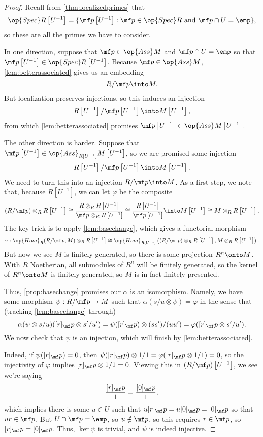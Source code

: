 \begin{proof}
	Recall from \autoref{thm:localizedprimes} that
	\[\op{Spec}R\left[U^{-1}\right]=\{\mf p\left[U^{-1}\right]:\mf p\in\op{Spec}R\text{ and }\mf p\cap U=\emp\},\]
	so these are all the primes we have to consider.
	
	In one direction, suppose that $\mf p\in\op{Ass}M$ and $\mf p\cap U=\emp$ so that $\mf p\left[U^{-1}\right]\in\op{Spec}R\left[U^{-1}\right]$. Because $\mf p\in\op{Ass}M$, \autoref{lem:betterassociated} gives us an embedding
	\[R/\mf p\into M.\]
	But localization preserves injections, so this induces an injection
	\[R\left[U^{-1}\right]/\mf p\left[U^{-1}\right]\into M\left[U^{-1}\right],\]
	from which \autoref{lem:betterassociated} promises $\mf p\left[U^{-1}\right]\in\op{Ass}M\left[U^{-1}\right]$.

	The other direction is harder. Suppose that $\mf p\left[U^{-1}\right]\in\op{Ass}_{R\left[U^{-1}\right]}M\left[U^{-1}\right]$, so we are promised some injection
	\[R\left[U^{-1}\right]/\mf p\left[U^{-1}\right]\into M\left[U^{-1}\right].\]
	We need to turn this into an injection $R/\mf p\into M$. As a first step, we note that, because $R\left[U^{-1}\right]$, we can let $\varphi$ be the composite
	\[(R/\mf p)\otimes_RR\left[U^{-1}\right]\cong\frac{R\otimes_RR\left[U^{-1}\right]}{\mf p\otimes_RR\left[U^{-1}\right]}\cong\frac{R\left[U^{-1}\right]}{\mf p\left[U^{-1}\right]}\into M\left[U^{-1}\right]\cong M\otimes_RR\left[U^{-1}\right].\]
	The key trick is to apply \autoref{lem:basechange}, which gives a functorial morphism
	\[\alpha:\op{Hom}_R(R/\mf p,M)\otimes_RR\left[U^{-1}\right]\cong\op{Hom}_{R\left[U^{-1}\right]}\left((R/\mf p)\otimes_RR\left[U^{-1}\right],M\otimes_RR\left[U^{-1}\right]\right).\]
	But now we see $M$ is finitely generated, so there is some projection $R^n\onto M$. With $R$ Noetherian, all submodules of $R^n$ will be finitely generated, so the kernel of $R^n\onto M$ is finitely generated, so $M$ is in fact finitely presented.
	
	Thus, \autoref{prop:basechange} promises our $\alpha$ is an isomorphism. Namely, we have some morphism $\psi:R/\mf p\to M$ such that $\alpha(s/u\otimes\psi)=\varphi$ in the sense that (tracking \autoref{lem:basechange} through)
	\[\alpha(\psi\otimes s/u)([r]_\mf p\otimes s'/u')=\psi([r]_\mf p)\otimes(ss')/(uu')=\varphi([r]_\mf p\otimes s'/u').\]
	We now check that $\psi$ is an injection, which will finish by \autoref{lem:betterassociated}.
	
	Indeed, if $\psi([r]_\mf p)=0$, then $\psi([r]_\mf p)\otimes1/1=\varphi([r]_\mf p\otimes1/1)=0$, so the injectivity of $\varphi$ implies $[r]_\mf p\otimes1/1=0$. Viewing this in $(R/\mf p)\left[U^{-1}\right]$, we see we're saying
	\[\frac{[r]_\mf p}1=\frac{[0]_\mf p}1,\]
	which implies there is some $u\in U$ such that $u[r]_\mf p=u[0]_\mf p=[0]_\mf p$ so that $ur\in\mf p$. But $U\cap\mf p=\emp$, so $u\notin\mf p$, so this requires $r\in\mf p$, so $[r]_\mf p=[0]_\mf p$. Thus, $\ker\psi$ is trivial, and $\psi$ is indeed injective.
\end{proof}
